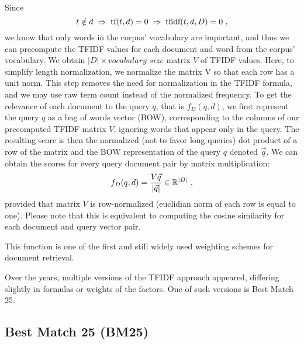 Since %
$$t\notin d \hspace{1mm}\Rightarrow\hspace{1mm} \text{tf}(t, d) = 0 \hspace{1mm}\Rightarrow\hspace{1mm} \text{tfidf}(t, d, D) = 0\ ,$$
we know that only words in the corpus' vocabulary are important, and thus we can precompute the TFIDF values for each document and word from the corpus' vocabulary.
We obtain $|D|\times {vocabulary\_size}$ matrix $V$ of TFIDF values.
Here, to simplify length normalization, we normalize the matrix V so that each row has a unit norm.
This step removes the need for normalization in the TFIDF formula, and we may use raw term count instead of the normalized frequency.
To get the relevance of each document to the query $q$, that is $f_D(q, d)$, we first represent the query $q$ as a bag of words vector (BOW), corresponding to the columns of our precomputed TFIDF matrix $V$, ignoring words that appear only in the query.
The resulting score is then the normalized (not to favor long queries) dot product of a row of the matrix and the BOW representation of the query $q$ denoted $\vec{q}$.
We can obtain the scores for every query document pair by matrix multiplication:
\begin{equation}
        f_D(q, d) = \frac{V\vec{q}}{|\vec{q}|} \in \mathbb{R}^{|D|}\ ,
\end{equation}
provided that matrix $V$ is row-normalized (euclidian norm of each row is equal to one).
Please note that this is equivalent to computing the cosine similarity for each document and query vector pair.

This function is one of the first and still widely used \citep{Beel2016} weighting schemes for document retrieval. 

Over the years, multiple versions of the TFIDF approach appeared, differing slightly in formulas or weights of the factors. One of such versions is Best Match 25. %

\subsection{Best Match 25 (BM25)}

